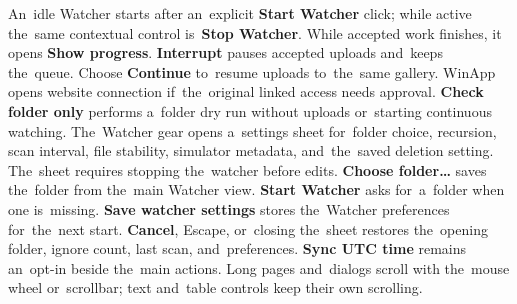 \documentclass[11pt,a4paper]{article}
\newcommand{\ui}[1]{\textbf{#1}}
\begin{document}
An~idle Watcher starts after an~explicit \ui{Start Watcher} click; while active the~same
contextual control is~\ui{Stop Watcher}. While accepted work finishes, it
opens \ui{Show progress}. \ui{Interrupt} pauses accepted uploads and~keeps
the~queue. Choose \ui{Continue} to~resume uploads to~the~same gallery.
WinApp opens website connection if~the~original linked access needs approval.
\ui{Check folder only} performs
a~folder
dry run without uploads or~starting continuous watching. The~Watcher gear opens
a~settings sheet for~folder choice, recursion, scan interval, file stability,
simulator metadata, and~the~saved deletion setting. The~sheet requires stopping
the~watcher before
edits. \ui{Choose folder…} saves the~folder from the~main Watcher view.
\ui{Start Watcher} asks for~a~folder when one is~missing.
\ui{Save watcher settings} stores the~Watcher preferences for~the~next start.
\ui{Cancel},
Escape, or~closing the~sheet restores the~opening folder, ignore count, last
scan, and~preferences.
\ui{Sync UTC time} remains an~opt-in beside the~main actions.
Long pages and~dialogs scroll with the~mouse wheel or~scrollbar; text and~table
controls keep their own scrolling.
\end{document}
